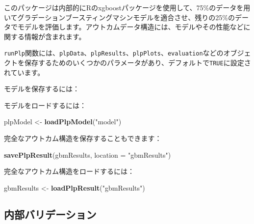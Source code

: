 \documentclass[
  11pt]{book}
\newenvironment{Shaded}{\begin{snugshade}}{\end{snugshade}}
\newcommand{\AttributeTok}[1]{\textcolor[rgb]{0.13,0.29,0.53}{#1}}
\newcommand{\FunctionTok}[1]{\textcolor[rgb]{0.13,0.29,0.53}{\textbf{#1}}}
\newcommand{\NormalTok}[1]{#1}
\newcommand{\OtherTok}[1]{\textcolor[rgb]{0.56,0.35,0.01}{#1}}
\newcommand{\SpecialCharTok}[1]{\textcolor[rgb]{0.81,0.36,0.00}{\textbf{#1}}}
\newcommand{\StringTok}[1]{\textcolor[rgb]{0.31,0.60,0.02}{#1}}
\theoremstyle{definition}
\theoremstyle{definition}
\theoremstyle{definition}
\theoremstyle{definition}
\theoremstyle{remark}
\begin{document}
このパッケージは内部的にRのxgboostパッケージを使用して、75\%のデータを用いてグラデーションブースティングマシンモデルを適合させ、残りの25\%のデータでモデルを評価します。アウトカムデータ構造には、モデルやその性能などに関する情報が含まれます。

\texttt{runPlp}関数には、\texttt{plpData}、\texttt{plpResults}、\texttt{plpPlots}、\texttt{evaluation}などのオブジェクトを保存するためのいくつかのパラメータがあり、デフォルトで\texttt{TRUE}に設定されています。

モデルを保存するには：

\begin{Shaded}
\end{Shaded}

モデルをロードするには：

\begin{Shaded}
\begin{Highlighting}[]
\NormalTok{plpModel }\OtherTok{\textless{}{-}} \FunctionTok{loadPlpModel}\NormalTok{(}\StringTok{"model"}\NormalTok{)}
\end{Highlighting}
\end{Shaded}

完全なアウトカム構造を保存することもできます：

\begin{Shaded}
\begin{Highlighting}[]
\FunctionTok{savePlpResult}\NormalTok{(gbmResults, }\AttributeTok{location =} \StringTok{"gbmResults"}\NormalTok{)}
\end{Highlighting}
\end{Shaded}

完全なアウトカム構造をロードするには：

\begin{Shaded}
\begin{Highlighting}[]
\NormalTok{gbmResults }\OtherTok{\textless{}{-}} \FunctionTok{loadPlpResult}\NormalTok{(}\StringTok{"gbmResults"}\NormalTok{)}
\end{Highlighting}
\end{Shaded}

\subsection{内部バリデーション}\label{ux5185ux90e8ux30d0ux30eaux30c7ux30fcux30b7ux30e7ux30f3}
\end{document}
